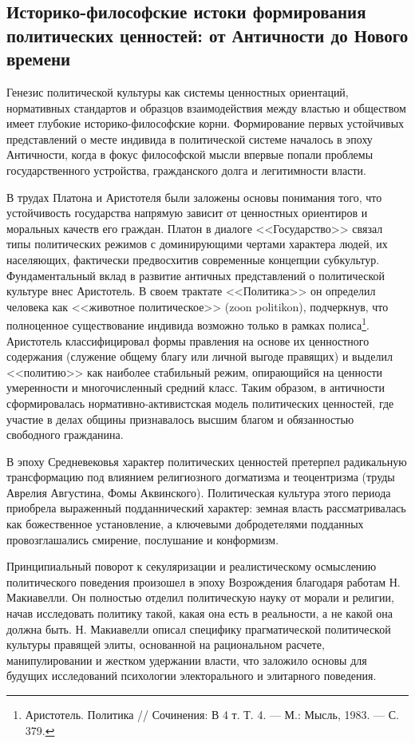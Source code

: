 \subsection{Историко-философские истоки формирования политических ценностей: от Античности до Нового времени}

Генезис политической культуры как системы ценностных ориентаций, нормативных стандартов и образцов взаимодействия между властью и обществом имеет глубокие историко-философские корни. Формирование первых устойчивых представлений о месте индивида в политической системе началось в эпоху Античности, когда в фокус философской мысли впервые попали проблемы государственного устройства, гражданского долга и легитимности власти. 

В трудах Платона и Аристотеля были заложены основы понимания того, что устойчивость государства напрямую зависит от ценностных ориентиров и моральных качеств его граждан. Платон в диалоге <<Государство>> связал типы политических режимов с доминирующими чертами характера людей, их населяющих, фактически предвосхитив современные концепции субкультур. Фундаментальный вклад в развитие античных представлений о политической культуре внес Аристотель. В своем трактате <<Политика>> он определил человека как <<животное политическое>> (zoon politikon), подчеркнув, что полноценное существование индивида возможно только в рамках полиса\footnote{Аристотель. Политика // Сочинения: В 4 т. Т. 4. --- М.: Мысль, 1983. --- С. 379.}. Аристотель классифицировал формы правления на основе их ценностного содержания (служение общему благу или личной выгоде правящих) и выделил <<политию>> как наиболее стабильный режим, опирающийся на ценности умеренности и многочисленный средний класс. Таким образом, в античности сформировалась нормативно-активистская модель политических ценностей, где участие в делах общины признавалось высшим благом и обязанностью свободного гражданина.

В эпоху Средневековья характер политических ценностей претерпел радикальную трансформацию под влиянием религиозного догматизма и теоцентризма (труды Аврелия Августина, Фомы Аквинского). Политическая культура этого периода приобрела выраженный подданнический характер: земная власть рассматривалась как божественное установление, а ключевыми добродетелями подданных провозглашались смирение, послушание и конформизм.

Принципиальный поворот к секуляризации и реалистическому осмыслению политического поведения произошел в эпоху Возрождения благодаря работам Н. Макиавелли. Он полностью отделил политическую науку от морали и религии, начав исследовать политику такой, какая она есть в реальности, а не какой она должна быть. Н. Макиавелли описал специфику прагматической политической культуры правящей элиты, основанной на рациональном расчете, манипулировании и жестком удержании власти, что заложило основы для будущих исследований психологии электорального и элитарного поведения.

